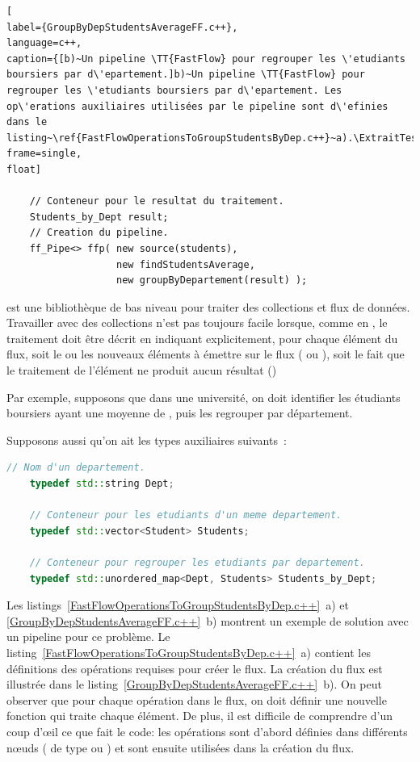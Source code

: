 \begin{lstlisting}[
label={GroupByDepStudentsAverageFF.c++},
language=c++,
caption={[b)~Un pipeline \TT{FastFlow} pour regrouper les \'etudiants boursiers par d\'epartement.]b)~Un pipeline \TT{FastFlow} pour regrouper les \'etudiants boursiers par d\'epartement. Les op\'erations auxiliaires utilisées par le pipeline sont d\'efinies dans le listing~\ref{FastFlowOperationsToGroupStudentsByDep.c++}~a).\ExtraitTestUnitaire},
frame=single,
float]

	// Conteneur pour le resultat du traitement.
	Students_by_Dept result;
	// Creation du pipeline.
	ff_Pipe<> ffp( new source(students),
				   new findStudentsAverage,
				   new groupByDepartement(result) );        

\end{lstlisting}

 est une biblioth\`eque de bas niveau pour traiter des collections et flux de donn\'ees. Travailler avec des collections n'est pas toujours facile lorsque, comme en , le traitement doit être décrit en indiquant explicitement, pour chaque élément du flux,  soit le ou les nouveaux éléments à émettre sur le flux ( ou ), soit le fait que le traitement de l'élément ne produit aucun résultat ()

Par exemple, supposons que dans une universit\'e, on doit identifier les \'etudiants boursiers ayant une moyenne de , puis les regrouper par d\'epartement.

\goodbreak
\begin{samepage}
Supposons aussi qu'on ait les types auxiliaires suivants~:
\begin{lstlisting}[language=c++]
    // Nom d'un departement.
    typedef std::string Dept;
    
    // Conteneur pour les etudiants d'un meme departement.
    typedef std::vector<Student> Students;

    // Conteneur pour regrouper les etudiants par departement.
    typedef std::unordered_map<Dept, Students> Students_by_Dept; 
\end{lstlisting}
\end{samepage}


Les listings~\ref{FastFlowOperationsToGroupStudentsByDep.c++}~a) et \ref{GroupByDepStudentsAverageFF.c++}~b) montrent un exemple de solution avec un pipeline  pour ce problème. Le listing~\ref{FastFlowOperationsToGroupStudentsByDep.c++}~a) contient les définitions des opérations requises pour créer le flux. La création du flux est illustrée dans le listing~\ref{GroupByDepStudentsAverageFF.c++}~b). On peut observer que pour chaque op\'eration dans le flux, on doit définir une nouvelle fonction qui traite chaque élément. De plus, il est difficile de comprendre d'un coup d'œil ce que fait le code: les op\'erations sont d'abord d\'efinies dans diff\'erents nœuds ( de type  ou ) et sont ensuite utilis\'ees dans la cr\'eation du flux. 

